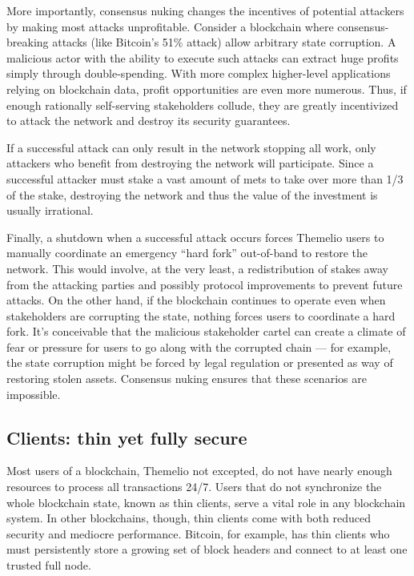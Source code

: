 \documentclass[headinclude]{scrbook}
\begin{document}

More importantly, consensus nuking changes the incentives of potential attackers by making most attacks unprofitable. Consider a blockchain where consensus-breaking attacks (like Bitcoin's 51\% attack) allow arbitrary state corruption. A malicious actor with the ability to execute such attacks can extract huge profits simply through double-spending. With more complex higher-level applications relying on blockchain data, profit opportunities are even more numerous. Thus, if enough rationally self-serving stakeholders collude, they are greatly incentivized to attack the network and destroy its security guarantees.

If a successful attack can only result in the network stopping all work, only attackers who benefit from destroying the network will participate. Since a successful attacker must stake a vast amount of mets to take over more than 1/3 of the stake, destroying the network and thus the value of the investment is usually irrational.

Finally, a shutdown when a successful attack occurs forces Themelio users to manually coordinate an emergency ``hard fork'' out-of-band to restore the network. This would involve, at the very least, a redistribution of stakes away from the attacking parties and possibly protocol improvements to prevent future attacks. On the other hand, if the blockchain continues to operate even when stakeholders are corrupting the state, nothing forces users to coordinate a hard fork. It's conceivable that the malicious stakeholder cartel can create a climate of fear or pressure for users to go along with the corrupted chain --- for example, the state corruption might be forced by legal regulation or presented as way of restoring stolen assets. Consensus nuking ensures that these scenarios are impossible.

\subsection{Clients: thin yet fully secure}

Most users of a blockchain, Themelio not excepted, do not have nearly enough resources to process all transactions 24/7. Users that do not synchronize the whole blockchain state, known as thin clients, serve a vital role in any blockchain system. In other blockchains, though, thin clients come with both reduced security and mediocre performance. Bitcoin, for example, has thin clients who must persistently store a growing set of block headers and connect to at least one trusted full node.
\end{document}
